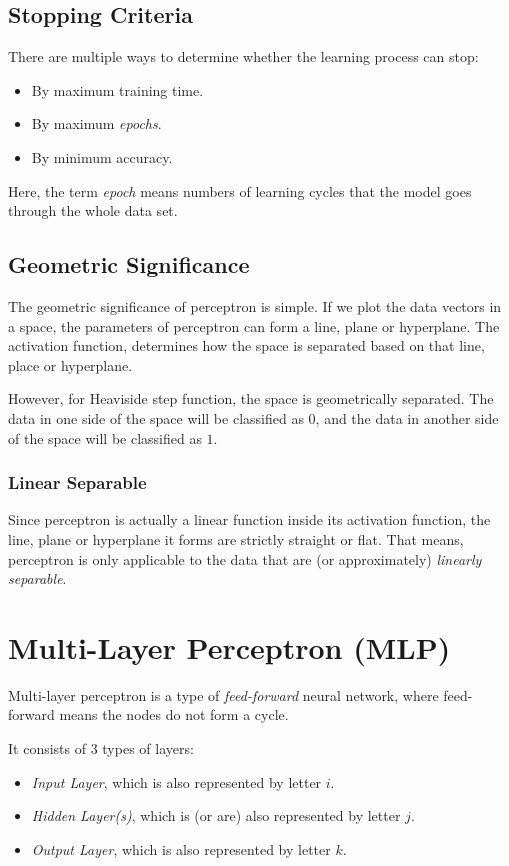 \documentclass{note}
\begin{document}
\subsection{Stopping Criteria}

There are multiple ways to determine whether the learning process can stop: 
\begin{itemize}
    \item By maximum training time.
    \item By maximum \textit{epochs}.
    \item By minimum accuracy.
\end{itemize}
Here, the term \textit{epoch} means numbers of learning cycles that the model goes through the whole data set.

\subsection{Geometric Significance}

The geometric significance of perceptron is simple. If we plot the data vectors in a space, the parameters of perceptron can form a line, plane or hyperplane. The activation function, determines how the space is separated based on that line, place or hyperplane. 

However, for Heaviside step function, the space is geometrically separated. The data in one side of the space will be classified as $0$, and the data in another side of the space will be classified as $1$.

\subsubsection{Linear Separable}

Since perceptron is actually a linear function inside its activation function, the line, plane or hyperplane it forms are strictly straight or flat. That means, perceptron is only applicable to the data that are (or approximately) \textit{linearly separable}. 

\section{Multi-Layer Perceptron (MLP)}

Multi-layer perceptron is a type of \textit{feed-forward} neural network, where feed-forward means the nodes do not form a cycle.

It consists of 3 types of layers: 
\begin{itemize}
    \item \textit{Input Layer}, which is also represented by letter $i$.
    \item \textit{Hidden Layer(s)}, which is (or are) also represented by letter $j$.
    \item \textit{Output Layer}, which is also represented by letter $k$.
\end{itemize}
\end{document}
